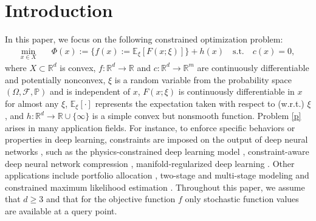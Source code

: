\documentclass[11pt]{article}
\numberwithin{equation}{section}
\newcommand{\R}{\mathbb{R}}
\newcommand{\E}{\mathbb{E}}
\newcommand{\be}{\begin{equation}}
\newcommand{\ee}{\end{equation}}
\begin{document}
\section{Introduction}
In this paper, we focus on the following constrained optimization problem:
\be\label{p}
\begin{aligned}
    \min_{x \in X}\quad  &\Phi(x):=\{f(x):= \E_\xi[F(x;\xi)]\} +  h(x)\quad \text{s.t.} \quad c(x) = 0,
\end{aligned}
\ee
where $X \subset \R^d$ is convex, $f: \R^d \rightarrow \R$ and $c: \R^d \rightarrow \R^m$ are continuously differentiable  and potentially  nonconvex, $\xi$ is a random variable from the probability space $(\Omega, \mathcal F, \mathbb P)$ and is independent of $x$, {$F(x;\xi)$} is continuously differentiable in  $x$ for almost any $\xi$, $\E_\xi[\cdot]$ represents the expectation taken with respect to (w.r.t.) $\xi$, and {$h:\R^d \to \R\cup \{\infty\} $} is a simple convex {but} nonsmooth function. 
Problem \eqref{p} arises in many application fields. For instance, to enforce specific behaviors or properties in deep learning, constraints are imposed on the output of deep neural networks \cite{conlab}, such as the physics-constrained deep learning model \cite{ZHU201956}, constraint-aware deep neural network compression \cite{Chen_2018_ECCV}, manifold-regularized deep learning \cite{roy2018}. 
Other applications include portfolio allocation \cite{bertsimas2018robust}, {two-stage and} multi-stage modeling \cite{shapiro2021lectures} and constrained maximum likelihood estimation \cite{chatterjee2016constrained}. 
Throughout this paper, we assume that $d\ge3$ and that for the objective function $f$ only stochastic function values are available at a query point.
\end{document}
